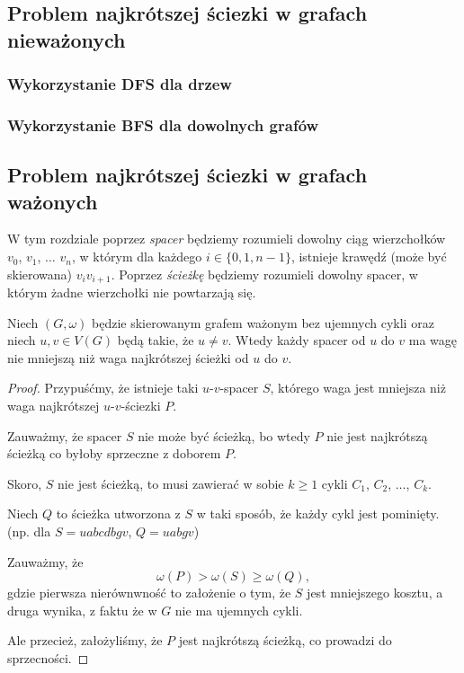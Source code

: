 \subsection{Problem najkrótszej ściezki w grafach nieważonych}
\subsubsection{Wykorzystanie DFS dla drzew}
\subsubsection{Wykorzystanie BFS dla dowolnych grafów}

\subsection{Problem najkrótszej ściezki w grafach ważonych}

W tym rozdziale poprzez \textit{spacer} będziemy rozumieli dowolny
ciąg wierzchołków $v_0$, $v_1$, $\dots$ $v_{n}$, w 
którym dla każdego $i \in \{0, 1, n-1\}$,
istnieje krawędź (może być skierowana)
$v_iv_{i+1}$. Poprzez \textit{ścieżkę}
będziemy rozumieli dowolny spacer, w którym
żadne wierzchołki nie powtarzają się.

\begin{lemma}
	Niech $(G,\omega)$ będzie skierowanym grafem ważonym 
	bez ujemnych cykli oraz niech $u,v \in V(G)$ będą
	takie, że $u \not = v$. Wtedy
	każdy spacer od $u$ do $v$ ma wagę nie 
	mniejszą niż waga
	najkrótszej ścieżki od $u$ do $v$.
	\begin{proof}
		Przypuśćmy, że istnieje taki $u$-$v$-spacer $S$, 
		którego waga jest mniejsza niż waga najkrótszej
		$u$-$v$-ściezki $P$. 
		
		Zauważmy, że spacer $S$ nie może być ścieżką, 
		bo wtedy $P$ nie jest najkrótszą ścieżką co 
		byłoby sprzeczne z doborem $P$.
		
		Skoro, $S$ nie jest ścieżką, to musi zawierać
		w sobie $k\geq 1$ cykli $C_1$, $C_2$, $\dots$, $C_k$. 
		
		Niech $Q$ to ścieżka utworzona z $S$ w taki sposób,
		że każdy cykl jest pominięty. (np. dla $S=uabcdbgv$, 
		$Q=uabgv$)
		
		Zauważmy, że
		\[\omega(P) > \omega(S) \geq \omega(Q),\]
		gdzie pierwsza nierównwność to założenie o
		tym, że $S$ jest mniejszego kosztu, a druga wynika,
		z faktu że w $G$ nie ma ujemnych cykli.
		
		Ale przecież, założyliśmy, że $P$ jest najkrótszą ścieżką,
		co prowadzi do sprzecności.
		
	\end{proof}
	\label{minpath_walk}
\end{lemma}

